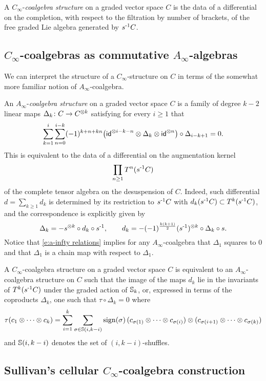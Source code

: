A $C_\infty$-\textit{coalgebra structure} on a graded vector space $C$ is the data of a differential on the completion, with respect to the filtration by number of brackets, of the free graded Lie algebra generated by $s^{\mbox{\scriptsize -1}}C$.

\subsection{$C_\infty$-coalgebras as commutative $A_\infty$-algebras} \label{ss:a-infty coalgebras}

We can interpret the structure of a $C_\infty$-structure on $C$ in terms of the somewhat more familiar notion of $A_\infty$-coalgebra.

An $A_\infty$-\textit{coalgebra structure} on a graded vector space $C$ is a family of degree $k-2$ linear maps $\Delta_k \colon C \to C^{\otimes k}$ satisfying for every $i \geq 1$ that
\begin{equation} \label{e:a-infty relations}
\sum_{k=1}^{i} \sum_{n=0}^{i-k} (-1)^{k+n+kn} \big( \mathsf{id}^{\otimes i-k-n} \otimes \Delta_k \otimes \mathsf{id}^{\otimes n} \big) \circ \Delta_{i-k+1} = 0.
\end{equation}
This is equivalent to the data of a differential on the augmentation kernel
\[
\prod_{n \geq 1} T^n(s^{\mbox{\scriptsize -1}} C)
\]
of the complete tensor algebra on the desuspension of $C$.
Indeed, such differential $d = \sum_{k \geq 1} d_k$ is determined by its restriction to $s^{\mbox{\scriptsize -1}} C$ with $d_k(s^{\mbox{\scriptsize -1}} C) \subset T^k(s^{\mbox{\scriptsize -1}} C)$, and the correspondence is explicitly given by
\[
\Delta_k = - s^{\otimes k} \circ d_k \circ s^{\mbox{\scriptsize -1}},
\qquad
d_k = -(-1)^{\frac{k(k+1)}{2}} (s^{\mbox{\scriptsize -1}})^{\otimes k} \circ \Delta_k \circ s.
\]
Notice that \eqref{e:a-infty relations} implies for any $A_\infty$-coalgebra that $\Delta_1$ squares to $0$ and that $\Delta_1$ is a chain map with respect to $\Delta_1$.

A $C_\infty$-coalgebra structure on a graded vector space $C$ is equivalent to an $A_\infty$-coalgebra structure on $C$ such that the image of the maps $d_k$ lie in the invariants of $T^k(s^{\mbox{\scriptsize -1}} C)$ under the graded action of $\mathbb{S}_k$, or, expressed in terms of the coproducts $\Delta_k$, one such that $\tau \circ \Delta_k = 0$ where
\[
\tau(c_1 \otimes \dotsb \otimes c_k) =
\sum_{i=1}^{k} \sum_{\sigma \in \mathbb{S}(i, k-i)} \operatorname{sign}(\sigma) \,
(c_{\sigma(1)} \otimes \dotsb \otimes c_{\sigma(i)}) \otimes
(c_{\sigma(i+1)} \otimes \dotsb \otimes c_{\sigma(k)})
\]
and $\mathbb{S}(i, k-i)$ denotes the set of $(i, k-i)$-shuffles.

\subsection{Sullivan's cellular $C_\infty$-coalgebra construction} \label{ss:dennis construction}

